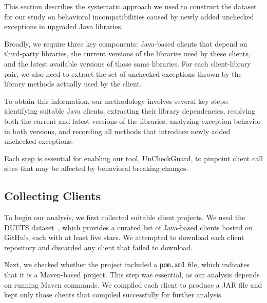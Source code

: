 This section describes the systematic approach we used to construct the dataset for our study on behavioral incompatibilities caused by newly added unchecked exceptions in upgraded Java libraries. 

Broadly, we require three key components: Java-based clients that depend on third-party libraries, the current versions of the libraries used by these clients, and the latest available versions of those same libraries. For each client-library pair, we also need to extract the set of unchecked exceptions thrown by the library methods actually used by the client.

To obtain this information, our methodology involves several key steps: identifying suitable Java clients, extracting their library dependencies, resolving both the current and latest versions of the libraries, analyzing exception behavior in both versions, and recording all methods that introduce newly added unchecked exceptions. 

Each step is essential for enabling our tool, UnCheckGuard, to pinpoint client call sites that may be affected by behavioral breaking changes.

\subsection{Collecting Clients}

To begin our analysis, we first collected suitable client projects. We used the DUETS dataset~\cite{durieux21:_duets}, which provides a curated list of Java-based clients hosted on GitHub, each with at least five stars. We attempted to download each client repository and discarded any client that failed to download.

Next, we checked whether the project included a \texttt{pom.xml} file, which indicates that it is a Maven-based project. This step was essential, as our analysis depends on running Maven commands. We compiled each client to produce a JAR file and kept only those clients that compiled successfully for further analysis.

